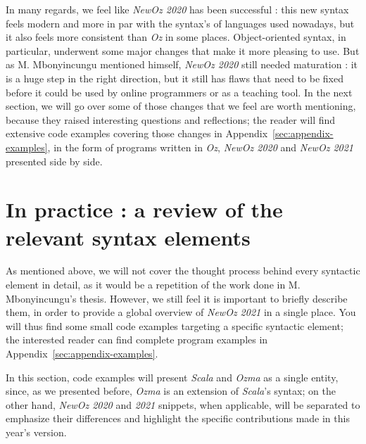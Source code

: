 In many regards, we feel like \textit{NewOz 2020} has been successful : this new syntax feels modern and more in par with the syntax's of languages used nowadays, but it also feels more consistent than \textit{Oz} in some places.
Object-oriented syntax, in particular, underwent some major changes that make it more pleasing to use.
But as M. Mbonyincungu mentioned himself, \textit{NewOz 2020} still needed maturation : it is a huge step in the right direction, but it still has flaws that need to be fixed before it could be used by online programmers or as a teaching tool.
In the next section, we will go over some of those changes that we feel are worth mentioning, because they raised interesting questions and reflections;
the reader will find extensive code examples covering those changes in Appendix~\ref{sec:appendix-examples}, in the form of programs written in \textit{Oz}, \textit{NewOz 2020} and \textit{NewOz 2021} presented side by side.

\section{In practice : a review of the relevant syntax elements}\label{sec:ch2-review}
As mentioned above, we will not cover the thought process behind every syntactic element in detail, as it would be a repetition of the work done in M. Mbonyincungu's thesis.
However, we still feel it is important to briefly describe them, in order to provide a global overview of \textit{NewOz 2021} in a single place.\newline
You will thus find some small code examples targeting a specific syntactic element;
the interested reader can find complete program examples in Appendix~\ref{sec:appendix-examples}.\newline

In this section, code examples will present \textit{Scala} and \textit{Ozma} as a single entity, since, as we presented before, \textit{Ozma} is an extension of \textit{Scala}'s syntax;
on the other hand, \textit{NewOz 2020} and \textit{2021} snippets, when applicable, will be separated to emphasize their differences and highlight the specific contributions made in this year's version.

